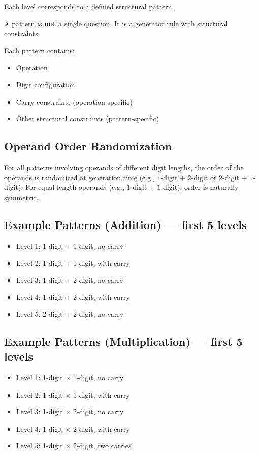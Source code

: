 \documentclass[11pt]{article}
\begin{document}
Each level corresponds to a defined structural pattern.

A pattern is \textbf{not} a single question. It is a generator rule with structural constraints.

Each pattern contains:

\begin{itemize}[leftmargin=*]
    \item Operation
    \item Digit configuration
    \item Carry constraints (operation-specific)
    \item Other structural constraints (pattern-specific)
\end{itemize}

\subsection*{Operand Order Randomization}

For all patterns involving operands of different digit lengths, 
the order of the operands is randomized at generation time 
(e.g., $1$-digit $+$ $2$-digit or $2$-digit $+$ $1$-digit).
For equal-length operands (e.g., $1$-digit $+$ $1$-digit), 
order is naturally symmetric.

\subsection*{Example Patterns (Addition) --- first 5 levels}

\begin{itemize}[leftmargin=*]
    \item Level 1: 1-digit + 1-digit, no carry
    \item Level 2: 1-digit + 1-digit, with carry
    \item Level 3: 1-digit + 2-digit, no carry
    \item Level 4: 1-digit + 2-digit, with carry
    \item Level 5: 2-digit + 2-digit, no carry
\end{itemize}

\subsection*{Example Patterns (Multiplication) --- first 5 levels}

\begin{itemize}[leftmargin=*]
    \item Level 1: 1-digit $\times$ 1-digit, no carry
    \item Level 2: 1-digit $\times$ 1-digit, with carry
    \item Level 3: 1-digit $\times$ 2-digit, no carry
    \item Level 4: 1-digit $\times$ 2-digit, with carry
    \item Level 5: 1-digit $\times$ 2-digit, two carries
\end{itemize}
\end{document}
